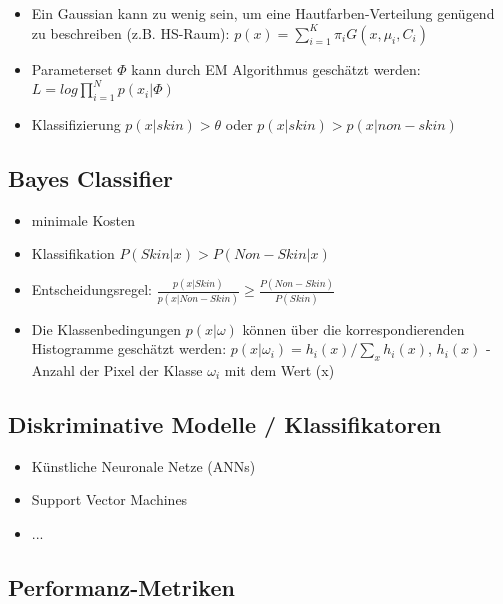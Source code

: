 \documentclass[paper=a4, fontsize=11pt]{scrartcl} %
\numberwithin{equation}{section} %
\numberwithin{figure}{section} %
\numberwithin{table}{section} %
\begin{document}
\begin{itemize}
\item Ein Gaussian kann zu wenig sein, um eine Hautfarben-Verteilung genügend zu beschreiben (z.B. HS-Raum): $p(x) = \sum\limits_{i=1}^K \pi_i G(x, \mu_i, C_i)$
\item Parameterset $\Phi$ kann durch EM Algorithmus geschätzt werden: $L = log \prod\limits_{i=1}^N p(x_i|\Phi)$
\item Klassifizierung $p(x|skin) > \theta$ oder $p(x|skin) > p(x|non-skin)$
\end{itemize}

\subsection{Bayes Classifier}

\begin{itemize}
\item minimale Kosten
\item Klassifikation $P(Skin|x) > P(Non-Skin|x)$
\item Entscheidungsregel: $\frac{p(x|Skin)}{p(x|Non-Skin)} \ge \frac{P(Non-Skin)}{P(Skin)}$
\item Die Klassenbedingungen $p(x|\omega)$ können über die korrespondierenden Histogramme geschätzt werden: $p(x|\omega_i) = h_i(x) / \sum\limits_x h_i(x)$, $h_i(x)$ - Anzahl der Pixel der Klasse $\omega_i$ mit dem Wert (x)
\end{itemize}

\subsection{Diskriminative Modelle / Klassifikatoren}

\begin{itemize}
\item Künstliche Neuronale Netze (ANNs)
\item Support Vector Machines
\item ...
\end{itemize}

\subsection{Performanz-Metriken}
\end{document}
